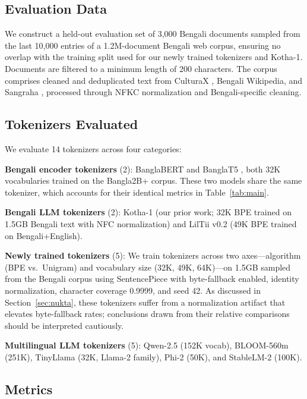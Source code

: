 \documentclass[11pt,a4paper]{article}
\begin{document}
\subsection{Evaluation Data}

We construct a held-out evaluation set of 3,000 Bengali documents sampled from the last 10,000 entries of a 1.2M-document Bengali web corpus, ensuring no overlap with the training split used for our newly trained tokenizers and Kotha-1.
Documents are filtered to a minimum length of 200 characters.
The corpus comprises cleaned and deduplicated text from CulturaX \cite{culturax2024}, Bengali Wikipedia, and Sangraha \cite{sangraha2024}, processed through NFKC normalization and Bengali-specific cleaning.

\subsection{Tokenizers Evaluated}

We evaluate 14 tokenizers across four categories:

\textbf{Bengali encoder tokenizers} (2): BanglaBERT and BanglaT5 \cite{banglabert2022,banglat5}, both 32K vocabularies trained on the Bangla2B+ corpus. These two models share the same tokenizer, which accounts for their identical metrics in Table~\ref{tab:main}.

\textbf{Bengali LLM tokenizers} (2): Kotha-1 \cite{kotha2026} (our prior work; 32K BPE trained on 1.5GB Bengali text with NFC normalization) and LilTii v0.2 \cite{liltii2026} (49K BPE trained on Bengali+English).

\textbf{Newly trained tokenizers} (5): We train tokenizers across two axes---algorithm (BPE vs.\ Unigram) and vocabulary size (32K, 49K, 64K)---on 1.5GB sampled from the Bengali corpus using SentencePiece \cite{kudo2018sentencepiece} with byte-fallback enabled, identity normalization, character coverage 0.9999, and seed 42. As discussed in Section~\ref{sec:nukta}, these tokenizers suffer from a normalization artifact that elevates byte-fallback rates; conclusions drawn from their relative comparisons should be interpreted cautiously.

\textbf{Multilingual LLM tokenizers} (5): Qwen-2.5 (152K vocab), BLOOM-560m (251K), TinyLlama (32K, Llama-2 family), Phi-2 (50K), and StableLM-2 (100K).

\subsection{Metrics}
\end{document}
